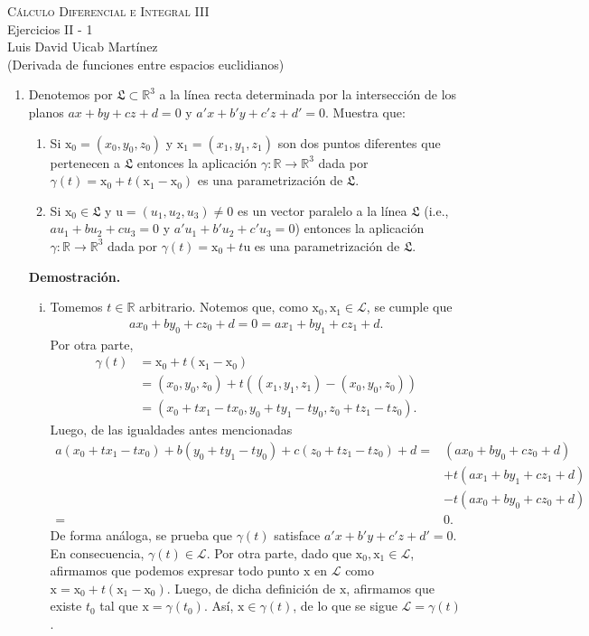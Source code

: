 \documentclass[12pt]{article}
\newcommand{\Ll}{\mathfrak L}
\newcommand{\R}{\mathbb R}
\newcommand{\x}{\mathrm x}
\newcommand{\To}{\longrightarrow}
\begin{document}
\pagestyle{empty}
\begin{center}
{\textsc{Cálculo Diferencial e Integral III} \\
\medskip 
\large{Ejercicios II - 1 \\
Luis David Uicab Martínez \\
(Derivada de funciones entre espacios euclidianos)}}
\end{center}
\bigskip

\begin{enumerate}

\item Denotemos por $\Ll\subset \R^3$ a la l\'inea recta determinada por la intersecci\'on de los planos $ax+by+cz+d=0$ y $a'x+b'y+c'z+d'=0$. Muestra que: 
\begin{enumerate}[(1)]
\item Si $\x_0=(x_0,y_0,z_0)$ y $\x_1=(x_1,y_1,z_1)$ son dos puntos diferentes que pertenecen a $\Ll$ entonces la aplicaci\'on $\gamma:\R\To \R^3$ dada por 
$\gamma(t)=\x_0+t(\x_1-\x_0)$ es una parametrizaci\'on de $\Ll$.  
\item Si $\x_0\in \Ll$ y $\mathrm u=(u_1,u_2,u_3)\neq 0$ es un vector paralelo a la l\'inea $\Ll$ (i.e., $au_1+bu_2+cu_3=0$ y $a'u_1+b'u_2+c'u_3=0$) entonces la aplicaci\'on $\gamma:\R\To \R^3$ dada por $\gamma(t)=\x_0+t\mathrm u$ es una parametrizaci\'on de $\Ll$.  
\end{enumerate}
\textbf{Demostración.}
\begin{enumerate}[(i)]
    \item Tomemos $t\in \R$ arbitrario. Notemos que, como $\x_0,\x_1 \in \mathcal{L}$, se cumple que
        \begin{align*}
            ax_0+by_0+cz_0+d=0=ax_1+by_1+cz_1+d.
        \end{align*}
        Por otra parte,
        \begin{align*}
            \gamma(t) &= \x_0+t(\x_1-\x_0) \\
            &= (x_0,y_0,z_0) + t((x_1,y_1,z_1)-(x_0,y_0,z_0)) \\
            &= (x_0 + tx_1 -tx_0,y_0 + ty_1 -ty_0,z_0 + tz_1 -tz_0).
        \end{align*}
        Luego, de las igualdades antes mencionadas
        \begin{align*}
            a(x_0 + tx_1 -tx_0)+b(y_0 + ty_1 -ty_0)+c(z_0 + tz_1 -tz_0) + d =& (ax_0+by_0+cz_0 + d) \\
            &+t(ax_1+by_1+cz_1+d) \\
            &-t(ax_0+by_0+cz_0+d) \\ 
            =&0.
        \end{align*}
        De forma análoga, se prueba que $\gamma(t)$ satisface $a'x+b'y+c'z+d'=0$. En consecuencia, $\gamma(t) \in \mathcal{L}$. Por otra parte, dado que $\x_0,\x_1 \in \mathcal{L}$, afirmamos que podemos expresar todo punto $\x$ en $\mathcal{L}$ como
        $\x=\x_0+t(\x_1-\x_0)$. Luego, de dicha definición de $\x$, afirmamos que existe $t_0$ tal que $\x=\gamma(t_0)$. Así, $\x \in \gamma(t)$, de lo que se sigue $\mathcal{L}=\gamma(t)$.


\end{enumerate}
\end{enumerate}
\end{document}
